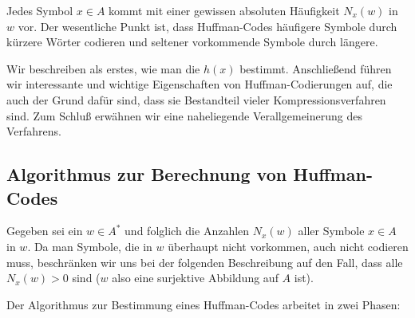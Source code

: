 Jedes Symbol $x\in A$ kommt mit einer gewissen absoluten Häufigkeit
$N_x(w)$ in $w$ vor.
%
Der wesentliche Punkt ist, dass Huffman-Codes häufigere Symbole durch
kürzere Wörter codieren und seltener vorkommende Symbole durch
längere.

Wir beschreiben als erstes, wie man die $h(x)$ bestimmt.
%
Anschließend führen wir interessante und wichtige Eigenschaften von
Huffman-Codierungen auf, die auch der Grund dafür sind, dass sie
Bestandteil vieler Kompressionsverfahren sind.
%
Zum Schluß erwähnen wir eine naheliegende Verallgemeinerung des
Verfahrens.

\Tut\subsection{Algorithmus zur Berechnung von Huffman-Codes}

Gegeben sei ein $w\in A^*$ und folglich die Anzahlen $N_x(w)$ aller
Symbole $x\in A$ in $w$.
%
Da man Symbole, die in $w$ überhaupt nicht vorkommen, auch nicht
codieren muss, beschränken wir uns bei der folgenden Beschreibung auf
den Fall, dass alle $N_x(w)>0$ sind ($w$ also eine surjektive
Abbildung auf $A$ ist).

Der Algorithmus zur Bestimmung eines Huffman-Codes arbeitet in zwei Phasen:

